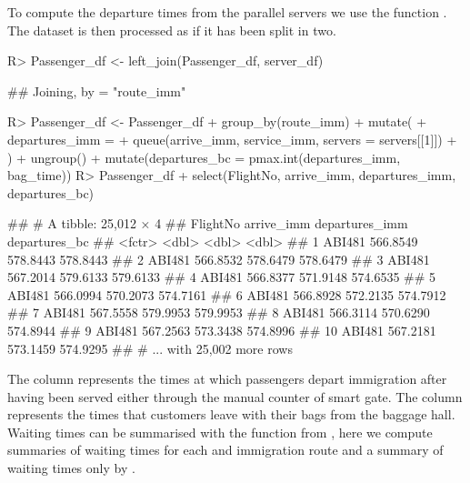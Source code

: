 \documentclass[article]{jss}
\begin{document}
To compute the departure times from the parallel servers we use the  function . The dataset is then processed as if it has been split in two. 

\begin{CodeChunk}
\begin{CodeInput}
R> Passenger_df <- left_join(Passenger_df, server_df)
\end{CodeInput}
\begin{CodeOutput}
## Joining, by = "route_imm"
\end{CodeOutput}
\begin{CodeInput}
R> Passenger_df <- Passenger_df %
+    group_by(route_imm) %
+    mutate(
+      departures_imm = 
+        queue(arrive_imm, service_imm, servers = servers[[1]])
+      ) %
+    ungroup() %
+    mutate(departures_bc = pmax.int(departures_imm, bag_time))
R> Passenger_df %
+    select(FlightNo, arrive_imm, departures_imm, departures_bc)
\end{CodeInput}
\begin{CodeOutput}
## # A tibble: 25,012 × 4
##    FlightNo arrive_imm departures_imm departures_bc
##      <fctr>      <dbl>          <dbl>         <dbl>
## 1    ABI481   566.8549       578.8443      578.8443
## 2    ABI481   566.8532       578.6479      578.6479
## 3    ABI481   567.2014       579.6133      579.6133
## 4    ABI481   566.8377       571.9148      574.6535
## 5    ABI481   566.0994       570.2073      574.7161
## 6    ABI481   566.8928       572.2135      574.7912
## 7    ABI481   567.5558       579.9953      579.9953
## 8    ABI481   566.3114       570.6290      574.8944
## 9    ABI481   567.2563       573.3438      574.8996
## 10   ABI481   567.2181       573.1459      574.9295
## # ... with 25,002 more rows
\end{CodeOutput}
\end{CodeChunk}

The column  represents the times at which passengers depart immigration after having been served either through the manual counter of smart gate. The column  represents the times that customers leave with their bags from the baggage hall. Waiting times can be summarised with the  function from , here we compute summaries of waiting times for each  and immigration route  and a summary of waiting times only by . 
\end{document}
